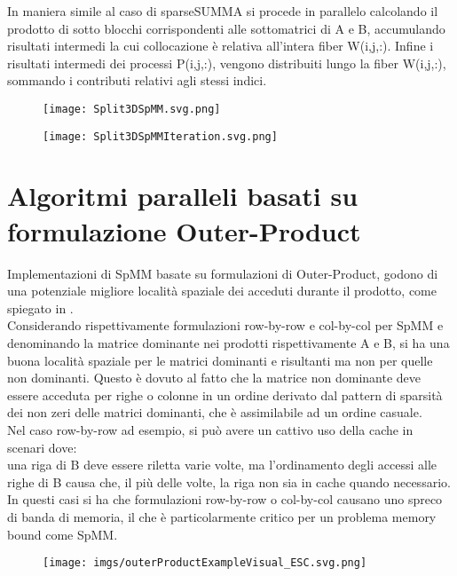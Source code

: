 In maniera simile al caso di sparseSUMMA %
si procede in parallelo calcolando il prodotto di sotto blocchi corrispondenti
alle sottomatrici di A e B, accumulando risultati intermedi la cui collocazione
è relativa all'intera fiber W(i,j,:).
Infine i risultati intermedi dei processi P(i,j,:), vengono distribuiti lungo la fiber
W(i,j,:), sommando i contributi relativi agli stessi indici.
\begin{figure}[h!] 
  \caption[Split3DSpMM, per una risoluzione parallela di SpMM con un partizionamento 3D
     nel caso semplificato di una griglia di processi $\sqrt{p/c}~x~\sqrt{p/c}~x~c$]
  \centering \texttt{[image: Split3DSpMM.svg.png]} \decoRule \label{figCode:Split3DSpMM}
\end{figure}
\begin{figure}[h!]
  \caption[esecuzione di un iterazione dell'algoritmo Split3DSpMM]
  \centering \texttt{[image: Split3DSpMMIteration.svg.png]} 
  \decoRule \label{fig:Split3DSpMMIteration}
\end{figure}

\section{Algoritmi paralleli basati su formulazione Outer-Product}
Implementazioni di SpMM basate su formulazioni di Outer-Product, godono di una
potenziale migliore località spaziale dei \nnz acceduti durante il prodotto,
come spiegato in \cite{ESC}.\\
\label{ChExistingTecqs:gustavsonDerivateBadAccessLocalityNNDominantMatrix}
Considerando rispettivamente formulazioni row-by-row e col-by-col per SpMM e denominando 
la matrice dominante nei prodotti rispettivamente A e B,
si ha una buona località spaziale per le matrici dominanti e risultanti ma non per quelle non dominanti.
Questo è dovuto al fatto che la matrice non dominante deve essere acceduta per righe o colonne 
in un ordine derivato dal pattern di sparsità dei non zeri delle matrici dominanti, che è assimilabile ad un ordine casuale.\\

Nel caso row-by-row ad esempio, si può avere un cattivo uso della cache in scenari dove:\\
una riga di B deve essere riletta varie volte, ma l'ordinamento degli accessi alle righe di B causa
che, il più delle volte, la riga non sia in cache quando necessario.\\
In questi casi si ha che formulazioni row-by-row o col-by-col causano uno spreco di banda di memoria,
il che è particolarmente critico per un problema memory bound come SpMM.\\
\begin{figure}[h!]
  \centering \texttt{[image: imgs/outerProductExampleVisual\_ESC.svg.png]}
  \caption[Visualizzazione di un prodotto tra matrici 4x4 mediante Outer-Product]
  \decoRule \label{fig:outerProductExampleVisual_ESC}
\end{figure}

